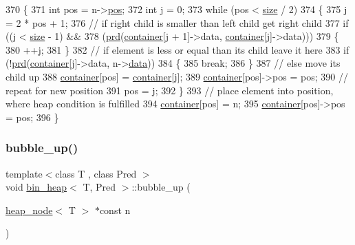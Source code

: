 \begin{DoxyCode}
370 \{
371     \textcolor{keywordtype}{int} pos = n->\mbox{\hyperlink{classheap__node_a6d6ebca320ede4a2dc3749caf0519534}{pos}};
372     \textcolor{keywordtype}{int} j = 0;
373     \textcolor{keywordflow}{while} (pos < \mbox{\hyperlink{classbin__heap_a8dde1008dcc24d734dbdb2c7ca50435b}{size}} / 2)
374     \{
375     j = 2 * pos + 1;
376     \textcolor{comment}{// if right child is smaller than left child get right child}
377     \textcolor{keywordflow}{if} ((j < \mbox{\hyperlink{classbin__heap_a8dde1008dcc24d734dbdb2c7ca50435b}{size}} - 1) &&
378         (\mbox{\hyperlink{classbin__heap_a5ecc420dfd03a6a0b4c9328cac1fae14}{prd}}(\mbox{\hyperlink{classbin__heap_a413200f4c6e24090c5e9a32184fc8857}{container}}[j + 1]->data, \mbox{\hyperlink{classbin__heap_a413200f4c6e24090c5e9a32184fc8857}{container}}[j]->data)))
379     \{
380         ++j;
381     \}
382     \textcolor{comment}{// if element is less or equal than its child leave it here}
383     \textcolor{keywordflow}{if} (!\mbox{\hyperlink{classbin__heap_a5ecc420dfd03a6a0b4c9328cac1fae14}{prd}}(\mbox{\hyperlink{classbin__heap_a413200f4c6e24090c5e9a32184fc8857}{container}}[j]->data, n->\mbox{\hyperlink{classheap__node_ae37815e49df4d367e28ca4615b40e397}{data}}))
384     \{
385         \textcolor{keywordflow}{break};
386     \}
387     \textcolor{comment}{// else move its child up}
388     \mbox{\hyperlink{classbin__heap_a413200f4c6e24090c5e9a32184fc8857}{container}}[pos] = \mbox{\hyperlink{classbin__heap_a413200f4c6e24090c5e9a32184fc8857}{container}}[j];
389     \mbox{\hyperlink{classbin__heap_a413200f4c6e24090c5e9a32184fc8857}{container}}[pos]->pos = pos;
390     \textcolor{comment}{// repeat for new position}
391     pos = j;
392     \}
393     \textcolor{comment}{// place element into position, where heap condition is fulfilled}
394     \mbox{\hyperlink{classbin__heap_a413200f4c6e24090c5e9a32184fc8857}{container}}[pos] = n;
395     \mbox{\hyperlink{classbin__heap_a413200f4c6e24090c5e9a32184fc8857}{container}}[pos]->pos = pos;
396 \}
\end{DoxyCode}
\mbox{\label{classbin__heap_aefc41dde4f1decfe523d23eb3d5e885f}} 
\subsubsection{\texorpdfstring{bubble\+\_\+up()}{bubble\_up()}}
{\footnotesize\ttfamily template$<$class T , class Pred $>$ \\
void \mbox{\hyperlink{classbin__heap}{bin\+\_\+heap}}$<$ T, Pred $>$\+::bubble\+\_\+up (\begin{DoxyParamCaption}\item[{\mbox{\hyperlink{classheap__node}{heap\+\_\+node}}$<$ T $>$ $\ast$const}]{n }\end{DoxyParamCaption})\hspace{0.3cm}{\ttfamily [private]}}



